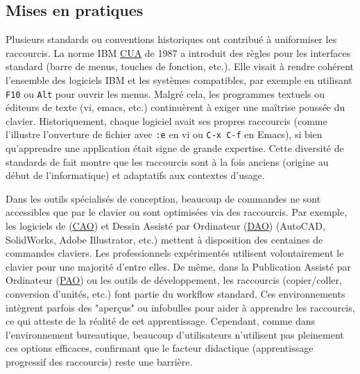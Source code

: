 \documentclass[a4paper,12pt]{article}
\begin{document}
\subsection{Mises en pratiques}
\label{sec:orgf75ae90}
Plusieurs standards ou conventions historiques ont contribué à uniformiser les raccourcis. La norme IBM \protect\hyperlink{gls-1}{\label{gls-1-use-2}CUA} de 1987 a introduit des règles pour les interfaces standard (barre de menus, touches de fonction, etc.)\autocite{berryEvolutionCommonUser1992}. Elle visait à rendre cohérent l'ensemble des logiciels IBM et les systèmes compatibles, par exemple en utilisant \texttt{F10} ou \texttt{Alt} pour ouvrir les menus. Malgré cela, les programmes textuels ou éditeurs de texte (vi, emacs, etc.) continuèrent à exiger une maîtrise poussée du clavier. Historiquement, chaque logiciel avait ses propres raccourcis (comme l’illustre l'ouverture de fichier avec \texttt{:e} en vi ou \texttt{C-x C-f} en Emacs), si bien qu’apprendre une application était signe de grande expertise. Cette diversité de standards de fait montre que les raccourcis sont à la fois anciens (origine au début de l’informatique) et adaptatifs aux contextes d'usage.

Dans les outils spécialisés de conception, beaucoup de commandes ne sont accessibles que par le clavier ou sont optimisées via des raccourcis. Par exemple, les logiciels de  (\protect\hyperlink{gls-5}{\label{gls-5-use-1}CAO}) et Dessin Assisté par Ordinateur	
 (\protect\hyperlink{gls-6}{\label{gls-6-use-1}DAO}) (AutoCAD, SolidWorks, Adobe Illustrator, etc.) mettent à disposition des centaines de commandes claviers. Les professionnels expérimentés utilisent volontairement le clavier pour une majorité d’entre elles. De même, dans la Publication Assisté par Ordinateur
 (\protect\hyperlink{gls-7}{\label{gls-7-use-1}PAO}) ou les outils de développement, les raccourcis (copier/coller, conversion d'unités, etc.) font partie du workflow standard. Ces environnements intègrent parfois des "aperçus" ou infobulles pour aider à apprendre les raccourcis, ce qui atteste de la réalité de cet apprentissage. Cependant, comme dans l'environnement bureautique, beaucoup d'utilisateurs n'utilisent pas pleinement ces options efficaces, confirmant que le facteur didactique (apprentissage progressif des raccourcis) reste une barrière.
\end{document}
